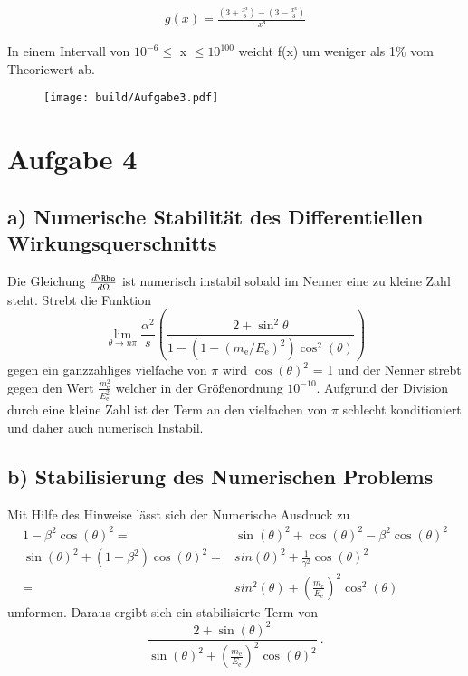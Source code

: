 \begin{align*}
	g(x) = \frac{(3 + \frac{x³}{3}) - (3 - \frac{x³}{3})}{x³}
\end{align*}

In einem Intervall von $10^{-6} \le$ x $\le 10^{100}$ weicht f(x) um weniger als 1\% vom Theoriewert ab. \\

\begin{figure}
	\centering
	\texttt{[image: build/Aufgabe3.pdf]}
\end{figure}
\section*{Aufgabe 4}
\subsection*{a) Numerische Stabilität des Differentiellen Wirkungsquerschnitts}
Die Gleichung $\frac{d\Rho}{d\Omega}$ ist numerisch instabil sobald im Nenner eine zu kleine Zahl steht. Strebt die Funktion 
\begin{equation}
  \lim\limits_{\theta \to n\pi} \frac{\alpha^2}{s} \left( \frac{2+\sin^2{\theta}}{1-(1-(m_\text{e}/E_\text{e})^2) \cos^2(\theta)} \right)
  \label{eqn:wirk}
\end{equation}
gegen ein ganzzahliges vielfache von $\pi$ wird $\cos(\theta)^2$ =  1 und der Nenner strebt gegen den Wert $\frac{m_\text{e}^2}{E_\text{e}^2}$ welcher in der Größenordnung $10^{-10}$. Aufgrund der Division durch eine kleine Zahl ist der Term an den vielfachen von $\pi$ schlecht konditioniert und daher auch numerisch Instabil.
\subsection*{b) Stabilisierung des Numerischen Problems}
Mit Hilfe des Hinweise lässt sich der Numerische Ausdruck zu 
\begin{eqnarray}
  1 -\beta^2 \cos(\theta)^2 =& \sin(\theta)^2 + \cos(\theta)^2 -\beta^2 \cos(\theta)^2 \\
  \sin(\theta)^2 + (1 - \beta^2) \cos(\theta)^2 =& sin(\theta)^2 + \frac{1}{\gamma^2} \cos(\theta)^2 \\
 =& sin^2(\theta) + \left( \frac{m_\text{e}}{E_\text{e}} \right)^2 \cos^2(\theta)
  \label{}
\end{eqnarray}
umformen. Daraus ergibt sich ein stabilisierte Term von 
\begin{equation}
  \frac{2 + \sin(\theta)^2}{\sin(\theta)^2 + (\frac{m_\text{e}}{E_\text{e}})^2 \cos(\theta)^2} \ .
  \label{}
\end{equation}

